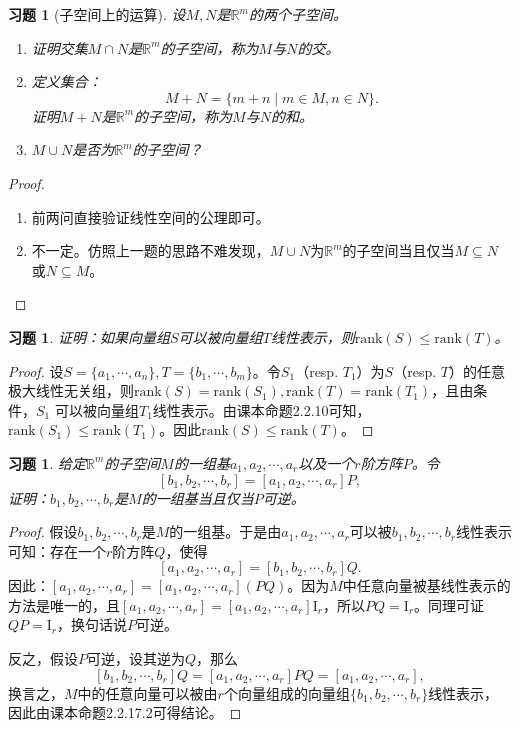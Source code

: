 \documentclass[UTF8]{ctexart}
\newtheorem{ex}[thm]{习题}
\begin{document}
\begin{ex}[子空间上的运算]
设$M, N$是$\mathbb{R}^m$的两个子空间。
\begin{enumerate}
\item
证明交集$M \cap N$是$\mathbb{R}^m$的子空间，称为$M$与$N$的交。
\item
定义集合：
\[
M + N = \{m+n \mid m \in M, n \in N\}.
\]
证明$M+N$是$\mathbb{R}^m$的子空间，称为$M$与$N$的和。
\item
$M \cup N$是否为$\mathbb{R}^m$的子空间？
\end{enumerate}
\end{ex}
\begin{proof}
\begin{enumerate}
\item
前两问直接验证线性空间的公理即可。
\item
不一定。仿照上一题的思路不难发现，$M \cup N$为$\mathbb{R}^m$的子空间当且仅当$M \subseteq N$或$N \subseteq M$。
\end{enumerate}
\end{proof}



\begin{ex}
证明：如果向量组$S$可以被向量组$T$线性表示，则$\mathrm{rank}(S) \leq \mathrm{rank}(T)$。
\end{ex}
\begin{proof}
设$S = \{a_1, \cdots, a_n\}, T = \{b_1, \cdots, b_m\}$。令$S_1$（resp. $T_1$）为$S$（resp. $T$）的任意极大线性无关组，则$\mathrm{rank}(S) = \mathrm{rank}(S_1), \mathrm{rank}(T) = \mathrm{rank}(T_1)$，且由条件，$S_1$ 可以被向量组$T_1$线性表示。由课本命题2.2.10可知，$\mathrm{rank}(S_1) \leq \mathrm{rank}(T_1)$。因此$\mathrm{rank}(S) \leq \mathrm{rank}(T)$。
\end{proof}


\begin{ex}
给定$\mathbb{R}^m$的子空间$M$的一组基$a_1, a_2, \cdots, a_r$以及一个$r$阶方阵$P$。令
\[
[b_1, b_2, \cdots, b_r] = [a_1, a_2, \cdots, a_r] P,
\]
证明：$b_1, b_2, \cdots, b_r$是$M$的一组基当且仅当$P$可逆。
\end{ex}
\begin{proof}
假设$b_1, b_2, \cdots, b_r$是$M$的一组基。于是由$a_1, a_2, \cdots, a_r$可以被$b_1, b_2, \cdots, b_r$线性表示可知：存在一个$r$阶方阵$Q$，使得
\[
[a_1, a_2, \cdots, a_r] = [b_1, b_2, \cdots, b_r] Q.
\]
因此：$[a_1, a_2, \cdots, a_r] = [a_1, a_2, \cdots, a_r] (PQ)$。因为$M$中任意向量被基线性表示的方法是唯一的，且$[a_1, a_2, \cdots, a_r] = [a_1, a_2, \cdots, a_r] \mathrm{I}_r$，所以$PQ = \mathrm{I}_r$。同理可证$QP = \mathrm{I}_r$，换句话说$P$可逆。
\

反之，假设$P$可逆，设其逆为$Q$，那么
\[
[b_1, b_2, \cdots, b_r] Q = [a_1, a_2, \cdots, a_r] PQ =  [a_1, a_2, \cdots, a_r],
\]
换言之，$M$中的任意向量可以被由$r$个向量组成的向量组$\{b_1, b_2, \cdots, b_r\}$线性表示，因此由课本命题2.2.17.2可得结论。
\end{proof}
\end{document}
